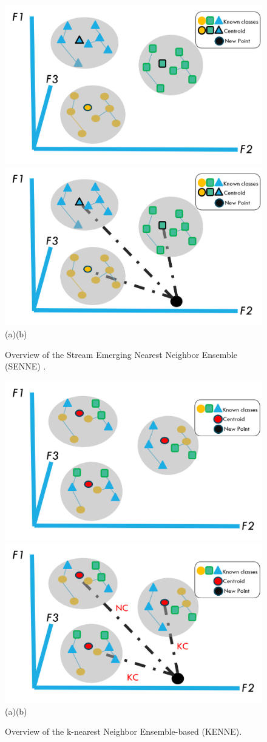 \begin{figure}[!ht]
    \begin{center}
        \includegraphics[width=.45\textwidth]{3_State-of-the-art/fig/senne0.png} 
        \includegraphics[width=.45\textwidth]{3_State-of-the-art/fig/senne.png} 
        (a)\hspace{6.5cm}(b)
    \end{center}
    \caption{Overview of the Stream Emerging Nearest Neighbor Ensemble (SENNE) \cite{zhu2020semi}.}
    \label{fig:SENNE}
    \end{figure}
    \vline
    \begin{figure}[!ht]    
        \begin{center}
            \includegraphics[width=.45\textwidth]{3_State-of-the-art/fig/kenne0.png} 
            \includegraphics[width=.45\textwidth]{3_State-of-the-art/fig/kenne.png}
            (a)\hspace{6.5cm}(b)
            \end{center}
    
        \caption{Overview of the k-nearest Neighbor Ensemble-based \cite{zhang2022knnens} (KENNE).}
        \label{fig:KENNE}
        \end{figure}
        

